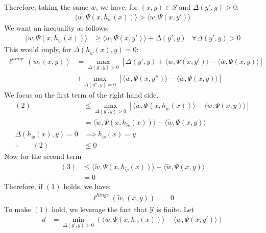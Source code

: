 \documentclass{amsart}
\theoremstyle{definition}
\begin{document}
\begin{enumerate}[(a)]
\begin{enumerate}[(i)]
        Therefore, taking the same $w$, we have, for $(x,y) \in S$ and $\Delta(y', y) > 0$:
        \begin{align*}
          \langle w, \Psi(x, h_w(x)) \rangle > \langle w, \Psi(x,y') \rangle 
        \end{align*}
        We want an inequality as follows:
        \begin{align}
          \langle \tilde{w}, \Psi(x, h_{\tilde{w}}(x)) \rangle & \ge \langle \tilde{w}, \Psi(x,y') \rangle + \Delta(y', y) & \forall \Delta(y',y) > 0
        \end{align}
        This would imply, for $\Delta(h_{\tilde{w}}(x), y) = 0$:
        \begin{align}
          \ell^{hinge}(\tilde{w}, (x,y)) &= \max_{\Delta(y', y) > 0 } \left[ \Delta(y', y) + \langle \tilde{w}, \Psi(x, y') \rangle - \langle \tilde{w}, \Psi(x, y) \rangle \right] \\
          &+ \max_{\Delta(y'', y) = 0} \left[ \langle \tilde{w}, \Psi(x, y'') \rangle - \langle \tilde{w}, \Psi(x, y) \rangle \right] 
        \end{align}
        We focus on the first term of the right hand side.
        \begin{align*}
          (2) &\le \max_{\Delta(y', y) > 0 } \left[ \langle \tilde{w}, \Psi(x, h_{\tilde{w}}(x)) \rangle - \langle \tilde{w}, \Psi(x, y) \rangle \right] \\
          &= \langle \tilde{w}, \Psi(x, h_{\tilde{w}}(x)) \rangle - \langle \tilde{w}, \Psi(x, y) \rangle \\
          \Delta(h_{\tilde{w}}(x), y) = 0 &\implies h_{\tilde{w}}(x) = y\\
          \therefore \qquad (2) &\le 0
        \end{align*}
        Now for the second term
        \begin{align*}
          (3) &\le \langle \tilde{w}, \Psi(x, h_{\tilde{w}}(x)) \rangle - \langle \tilde{w}, \Psi(x, y) \rangle \\
          &= 0
        \end{align*}
        Therefore, if $(1)$ holds, we have:
        \begin{align*}
          \ell^{hinge}(\tilde{w}, (x,y)) &= 0
        \end{align*}
        To make $(1)$ hold, we leverage the fact that $\mathcal{Y}$ is finite. Let
        \begin{align*}
          d &= \min_{\Delta(y', y) > 0} (\langle w, \Psi(x, h_w(x)) \rangle - \langle w, \Psi(x, y') \rangle)

\end{align*}
\end{enumerate}
\end{enumerate}
\end{document}

